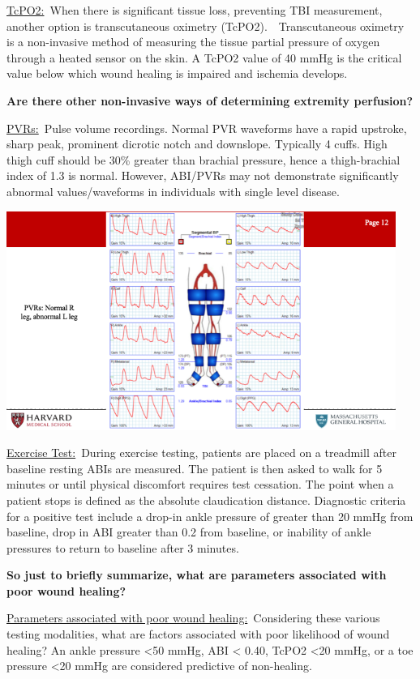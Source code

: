 \documentclass[
]{book}
\begin{document}
\underline{TcPO2:}~When there is significant tissue loss, preventing TBI
measurement, another option is transcutaneous oximetry
(TcPO2).~~Transcutaneous oximetry is a non-invasive method of measuring
the tissue partial pressure of oxygen through a heated sensor on the
skin. A TcPO2 value of 40 mmHg is the critical value below which wound
healing is impaired and ischemia develops.

\textbf{Are there other non-invasive ways of determining extremity
perfusion?}

\underline{PVRs:}~Pulse volume recordings. Normal PVR waveforms have a rapid
upstroke, sharp peak, prominent dicrotic notch and downslope. Typically
4 cuffs. High thigh cuff should be 30\% greater than brachial pressure,
hence a thigh-brachial index of 1.3 is normal. However, ABI/PVRs may not
demonstrate significantly abnormal values/waveforms in individuals with
single level disease.

\includegraphics[width=5in]{images/vasc_lab/Slide13}

\underline{Exercise Test:}~During exercise testing, patients are placed on a
treadmill after baseline resting ABIs are measured. The patient is then
asked to walk for 5 minutes or until physical discomfort requires test
cessation. The point when a patient stops is defined as the absolute
claudication distance. Diagnostic criteria for a positive test include a
drop-in ankle pressure of greater than 20 mmHg from baseline, drop in
ABI greater than 0.2 from baseline, or inability of ankle pressures to
return to baseline after 3 minutes.

\textbf{So just to briefly summarize, what are parameters associated with poor
wound healing?}

\underline{Parameters associated with poor wound healing:}~Considering these
various testing modalities, what are factors associated with poor
likelihood of wound healing? An ankle pressure \textless50 mmHg, ABI \textless{} 0.40,
TcPO2 \textless20 mmHg, or a toe pressure \textless20 mmHg are considered predictive
of non-healing.
\end{document}
